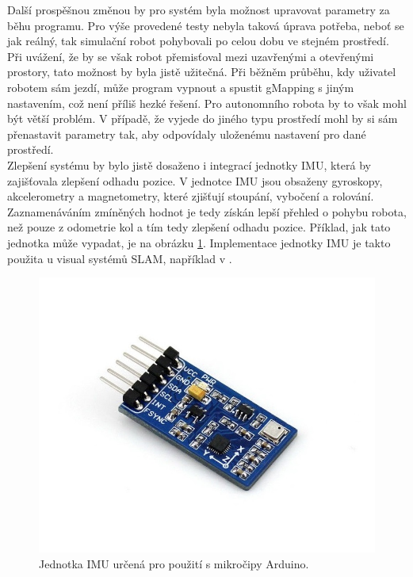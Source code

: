 \documentclass[12pt]{report}
\begin{document}
\indent Další prospěšnou změnou by pro systém byla možnost upravovat parametry za běhu programu. Pro výše provedené testy nebyla taková úprava potřeba, neboť se jak reálný, tak simulační robot pohybovali po celou dobu ve stejném prostředí. Při uvážení, že by se však robot přemisťoval mezi uzavřenými a otevřenými prostory, tato možnost by byla jistě užitečná. Při běžněm průběhu, kdy uživatel robotem sám jezdí, může program vypnout a spustit gMapping s jiným nastavením, což není příliš hezké řešení. Pro autonomního robota by to však mohl být větší problém. V případě, že vyjede do jiného typu prostředí mohl by si sám přenastavit parametry tak, aby odpovídaly uloženému nastavení pro dané prostředí.\\
\indent Zlepšení systému by bylo jistě dosaženo i integrací jednotky IMU, která by zajišťovala zlepšení odhadu pozice. V jednotce IMU jsou obsaženy gyroskopy, akcelerometry a magnetometry, které zjišťují stoupání, vybočení a rolování. Zaznamenáváním zmíněných hodnot je tedy získán lepší přehled o pohybu robota, než pouze z odometrie kol a tím tedy zlepšení odhadu pozice. Příklad, jak tato jednotka může vypadat, je na obrázku \ref{fig:imu}. Implementace jednotky IMU je takto použita u visual systémů SLAM, například v \cite{Leutenegger2013}.\\
\begin{figure}[!ht]
	\begin{center}
		\includegraphics[width=0.5\columnwidth]{imgs/imu.jpg}
	\end{center}
	\caption{Jednotka IMU určená pro použití s mikročipy Arduino.}
	\label{fig:imu}
\end{figure}
\end{document}
